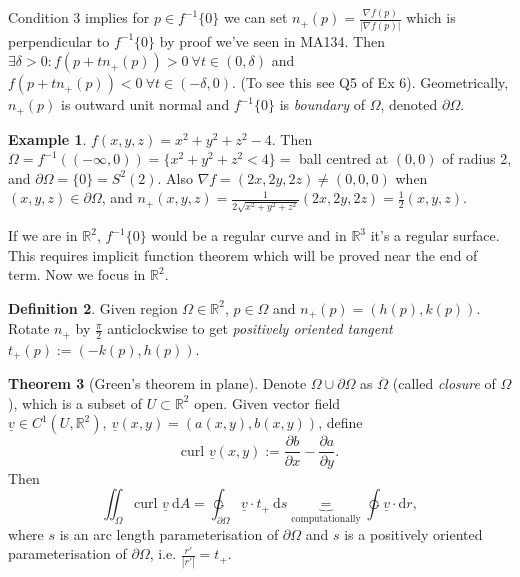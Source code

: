 \documentclass[a4paper]{article}
\theoremstyle{definition}
\newcommand{\curl}{\text{curl }}
\newtheorem{defn}{Definition}[subsection]
\newtheorem{thm}[defn]{Theorem}
\newtheorem{eg}[defn]{Example}
\begin{document}
Condition 3 implies for $p\in f^{-1}\{0\}$ we can set $n_+ (p) = \frac{\nabla f(p)}{|\nabla f(p)|}$ which is perpendicular to $f^{-1}\{0\}$ by proof we've seen in MA134. Then $\exists \delta >0: f(p+tn_+ (p)) >0 \ \forall t\in (0,\delta)$ and $f(p+tn_+ (p)) <0 \ \forall t\in (-\delta,0)$. (To see this see Q5 of Ex 6). Geometrically, $n_+ (p)$ is outward unit normal and $f^{-1}\{0\}$ is \textit{boundary} of $\Omega$, denoted $\partial \Omega$.

\begin{eg}
$f(x,y,z) = x^2+y^2+z^2-4$. Then $\Omega = f^{-1} ((-\infty,0)) = \{x^2+y^2+z^2 <4\}=$ ball centred at $(0,0)$ of radius 2, and $\partial \Omega = \{0\}=S^2(2).$ Also $\nabla f = (2x,2y,2z) \neq (0,0,0)$ when $(x,y,z) \in \partial \Omega$, and $n_+ (x,y,z) = \frac1{2\sqrt{x^2+y^2+z^2}} (2x,2y,2z) = \frac12 (x,y,z)$.
\end{eg}

If we are in $\mathbb R^2$, $f^{-1}\{0\}$ would be a regular curve and in $\mathbb R^3$ it's a regular surface. This requires implicit function theorem which will be proved near the end of term. Now we focus in $\mathbb R^2$.

\begin{defn}
Given region $\Omega \in \mathbb R^2$, $p\in \Omega$ and $n_+ (p) = (h(p),k(p)).$ Rotate $n_+$ by $\frac{\pi}{2}$ anticlockwise to get \textit{positively oriented tangent} $t_+(p):=(-k(p),h(p))$.
\end{defn}

\begin{thm}[Green's theorem in plane]
Denote $\Omega \cup \partial \Omega$ as $\overline{\Omega}$ (called \textit{closure} of $\Omega$), which is a subset of $U\subset \mathbb R^2$ open. Given vector field $\underline v \in C^1 (U,\mathbb R^2),\ \underline v(x,y) = \left(a(x,y),b(x,y)\right)$, define
\[
\curl \underline v (x,y) := \frac{\partial b}{\partial x}-\frac{\partial a}{\partial y}.
\]
Then
\[
\iint_\Omega \curl \underline v \ \mathrm d A = \ointctrclockwise_{\partial \Omega} \underline v \cdot t_+ \ \mathrm d s \underbrace{=}_{\text{computationally}} \ointctrclockwise \underline v \cdot \mathrm d r,
\]
where $s$ is an arc length parameterisation of $\partial \Omega$ and $s$ is a positively oriented parameterisation of $\partial \Omega$, i.e. $\frac{r'}{|r'|} = t_+$.
\end{thm}
\end{document}
